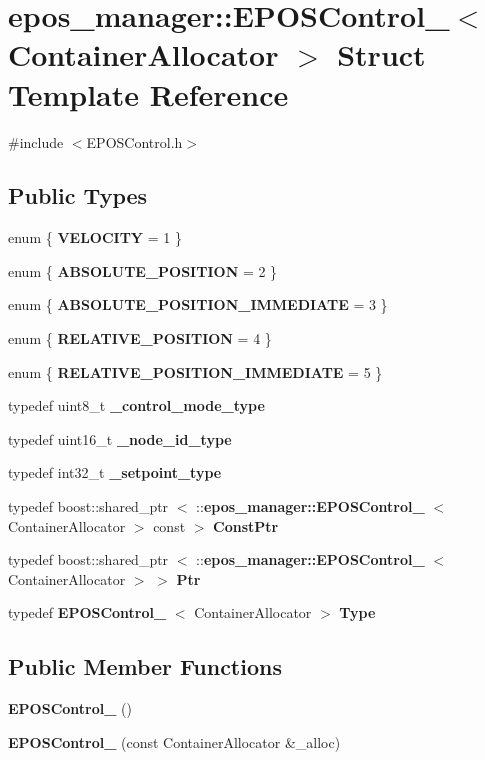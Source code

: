 \section{epos\-\_\-manager\-:\-:\-E\-P\-O\-S\-Control\-\_\-$<$ \-Container\-Allocator $>$ \-Struct \-Template \-Reference}
\label{structepos__manager_1_1EPOSControl__}


{\ttfamily \#include $<$\-E\-P\-O\-S\-Control.\-h$>$}

\subsection*{\-Public \-Types}
\begin{DoxyCompactItemize}
\item 
enum \{ {\bf \-V\-E\-L\-O\-C\-I\-T\-Y} =  1
 \}
\item 
enum \{ {\bf \-A\-B\-S\-O\-L\-U\-T\-E\-\_\-\-P\-O\-S\-I\-T\-I\-O\-N} =  2
 \}
\item 
enum \{ {\bf \-A\-B\-S\-O\-L\-U\-T\-E\-\_\-\-P\-O\-S\-I\-T\-I\-O\-N\-\_\-\-I\-M\-M\-E\-D\-I\-A\-T\-E} =  3
 \}
\item 
enum \{ {\bf \-R\-E\-L\-A\-T\-I\-V\-E\-\_\-\-P\-O\-S\-I\-T\-I\-O\-N} =  4
 \}
\item 
enum \{ {\bf \-R\-E\-L\-A\-T\-I\-V\-E\-\_\-\-P\-O\-S\-I\-T\-I\-O\-N\-\_\-\-I\-M\-M\-E\-D\-I\-A\-T\-E} =  5
 \}
\item 
typedef uint8\-\_\-t {\bf \-\_\-control\-\_\-mode\-\_\-type}
\item 
typedef uint16\-\_\-t {\bf \-\_\-node\-\_\-id\-\_\-type}
\item 
typedef int32\-\_\-t {\bf \-\_\-setpoint\-\_\-type}
\item 
typedef boost\-::shared\-\_\-ptr\*
$<$ \-::{\bf epos\-\_\-manager\-::\-E\-P\-O\-S\-Control\-\_\-}\*
$<$ \-Container\-Allocator $>$ const  $>$ {\bf \-Const\-Ptr}
\item 
typedef boost\-::shared\-\_\-ptr\*
$<$ \-::{\bf epos\-\_\-manager\-::\-E\-P\-O\-S\-Control\-\_\-}\*
$<$ \-Container\-Allocator $>$ $>$ {\bf \-Ptr}
\item 
typedef {\bf \-E\-P\-O\-S\-Control\-\_\-}\*
$<$ \-Container\-Allocator $>$ {\bf \-Type}
\end{DoxyCompactItemize}
\subsection*{\-Public \-Member \-Functions}
\begin{DoxyCompactItemize}
\item 
{\bf \-E\-P\-O\-S\-Control\-\_\-} ()
\item 
{\bf \-E\-P\-O\-S\-Control\-\_\-} (const \-Container\-Allocator \&\-\_\-alloc)
\end{DoxyCompactItemize}
